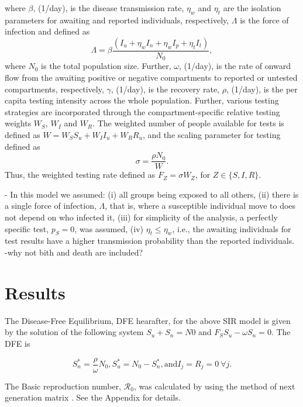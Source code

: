 \documentclass{article}
\newcommand{\Rnum}{\mathcal{R}_0}
\begin{document}
where $\beta$, (1/day), is the disease transmission rate, $\eta_w$ and $\eta_t$ are the isolation parameters for awaiting and reported individuals, respectively, $\Lambda$ is the force of infection and defined as 
\begin{equation}
\label{Lambda}
\Lambda=\beta \frac{(I_u+\eta_w I_n+\eta_w I_p+ \eta_t I_t)}{N_0},
\end{equation}
where $N_0$ is the total population size. Further, $\omega$, (1/day), is the rate of onward flow from the awaiting positive or negative compartments to reported or untested compartments, respectively, $\gamma$, (1/day), is the recovery rate, $\rho$, (1/day), is the per capita testing intensity across the whole population. Further, various testing strategies are incorporated through the compartment-specific relative testing weights $W_S$, $W_I$ and $W_R$. The weighted number of people available for tests is defined as $W = W_S S_u + W_I I_u + W_R R_u$, and the scaling parameter for testing defined as \begin{equation}
\label{sigma}
\sigma = \frac{\rho N_0}{W}.
\end{equation}
Thus, the weighted testing rate defined as $F_Z=\sigma W_Z$, for $Z \in \{S,I,R\}$. 

- In this model we assumed: (i) all groups being exposed to all others, (ii) there is a single force of infection, $\Lambda$, that is, where a susceptible individual move to does not depend on who infected it, (iii) for simplicity of the analysis, a perfectly specific test, $p_S=0$, was assumed, (iv)  $\eta_t \leq \eta_w$, i.e., the awaiting individuals for test results have a higher transmission probability than the reported individuals. 
-why not bith and death are included?

\section{Results}

The Disease-Free Equilibrium, DFE hearafter, for the above SIR model is given by the solution of the following system $S_u+S_n=N0$ and $F_S S_u-\omega S_n=0$. The DFE is

\begin{equation}
\label{dfe}
S_n^*= \frac{\rho}{\omega} N_0, S_u^*= N_0-S_n^*, \text{and} I_j=R_j=0 \ \forall j.
\end{equation}

The Basic reproduction number, $\Rnum$, was calculated by using the method of next generation matrix \cite{van2002reproduction}. See the Appendix for details.
\end{document}
